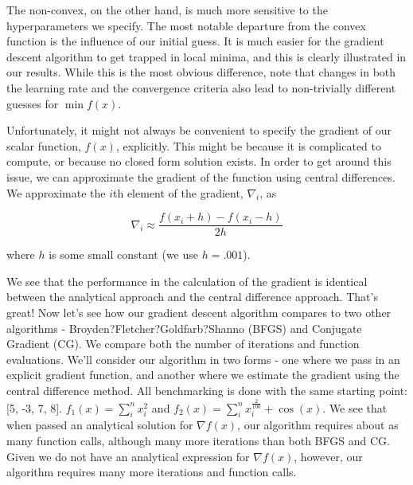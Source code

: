 \documentclass[10pt]{article}
\begin{document}
The non-convex, on the other hand, is much more sensitive to the hyperparameters we specify. The most notable departure from the convex function is the influence of our initial guess. It is much easier for the gradient descent algorithm to get trapped in local minima, and this is clearly illustrated in our results. While this is the most obvious difference, note that changes in both the learning rate and the convergence criteria also lead to non-trivially different guesses for $\min{f(x)}$.

Unfortunately, it might not always be convenient to specify the gradient of our scalar function, $f(x)$, explicitly. This might be because it is complicated to compute, or because no closed form solution exists. In order to get around this issue, we can approximate the gradient of the function using central differences. We approximate the $i$th element of the gradient, $\nabla_i$, as

\begin{equation}
\nabla_i \approx \frac{f(x_i+h) - f(x_i-h)}{2h}
\end{equation} 

\noindent where $h$ is some small constant (we use $h = .001$).

We see that the performance in the calculation of the gradient is identical between the analytical approach and the central difference approach. That's great! Now let's see how our gradient descent algorithm compares to two other algorithms - Broyden?Fletcher?Goldfarb?Shanno (BFGS) and Conjugate Gradient (CG). We compare both the number of iterations and function evaluations. We'll consider our algorithm in two forms - one where we pass in an explicit gradient function, and another where we estimate the gradient using the central difference method. All benchmarking is done with the same starting point: [5, -3, 7, 8]. $f_1(x) =  \sum_i^n x_i^2$ and $f_2(x) = \sum_i^n x_i^{\frac{2}{100}} + \cos(x)$. We see that when passed an analytical solution for $\nabla f(x)$, our algorithm requires about as many function calls, although many more iterations than both BFGS and CG. Given we do not have an analytical expression for $\nabla f(x)$, however, our algorithm requires many more iterations and function calls.
\end{document}

